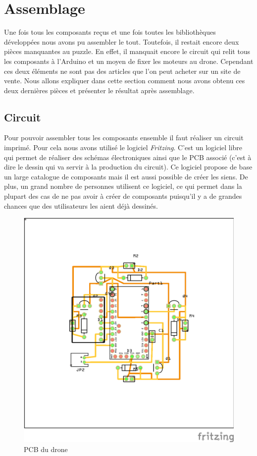 \documentclass[a4paper,10pt]{report}
\begin{document}
    \section{Assemblage}
      Une fois tous les composants reçus et une fois toutes les bibliothèques 
développées nous avons pu assembler le tout. Toutefois, il restait encore deux 
pièces manquantes au puzzle. En effet, il manquait encore le circuit qui relit 
tous les composants à l'Arduino et un moyen de fixer les moteurs au drone. 
Cependant ces deux éléments ne sont pas des articles que l'on peut acheter sur 
un site de vente. Nous allons expliquer dans cette section comment nous avons 
obtenu ces deux dernières pièces et présenter le résultat après assemblage.

      \subsection{Circuit}
	Pour pouvoir assembler tous les composants ensemble il faut réaliser un 
circuit imprimé. Pour cela nous avons utilisé le logiciel 
\textit{Fritzing}\cite{fritzing}. C'est un logiciel libre qui permet de 
réaliser des schémas électroniques ainsi que le PCB associé (c'est à dire le 
dessin qui va servir à la production du circuit). Ce logiciel propose de base 
un large catalogue de composants mais il est aussi possible de créer les siens. 
De plus, un grand nombre de personnes utilisent ce logiciel, ce qui permet 
dans la plupart des cas de ne pas avoir à créer de composants puisqu'il y a de 
grandes chances que des utilisateurs les aient déjà dessinés.

      \begin{figure}[htbp]%
	\centering
	\includegraphics[scale = 0.9]{img/nouveau_drone_circuit_pcb.png}
	\caption{PCB du drone}
	\label{pcb1drone}
      \end{figure}
      
\end{document}
